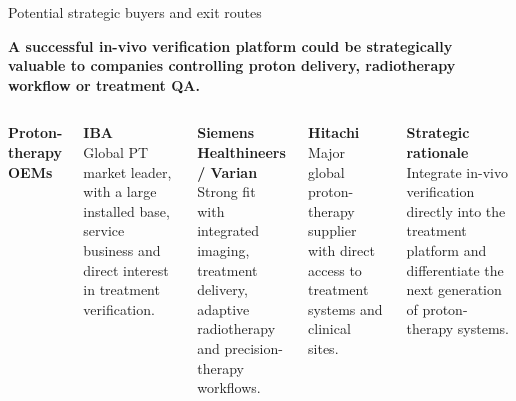 \documentclass[aspectratio=169,11pt]{beamer}
\begin{document}
\begin{frame}{Potential strategic buyers and exit routes}

\vspace{0.05cm}

\begin{center}
\scriptsize\bfseries
A successful in-vivo verification platform could be strategically valuable
to companies controlling proton delivery, radiotherapy workflow or treatment QA.
\end{center}

\vspace{0.25cm}

\begin{columns}[T,onlytextwidth]


{\scriptsize\bfseries\color{PTblue}Proton-therapy OEMs\par}
\vspace{0.12cm}
\tiny

\textbf{IBA}\\

Global PT market leader, with a large installed base,
service business and direct interest in treatment verification.

\vspace{0.15cm}

\textbf{Siemens Healthineers / Varian}\\
Strong fit with integrated imaging, treatment delivery,
adaptive radiotherapy and precision-therapy workflows.

\vspace{0.15cm}

\textbf{Hitachi}\\
Major global proton-therapy supplier with direct access
to treatment systems and clinical sites.

\vspace{0.25cm}

\textbf{Strategic rationale}\\
Integrate in-vivo verification directly into the treatment platform
and differentiate the next generation of proton-therapy systems.




\end{columns}
\end{frame}
\end{document}
